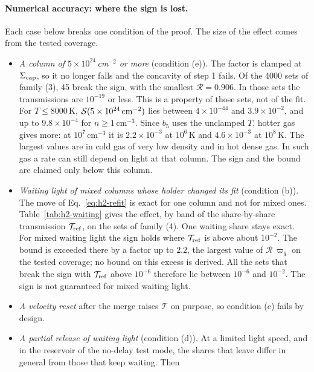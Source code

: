 \paragraph{Numerical accuracy: where the sign is lost.} Each case below breaks
one condition of the proof. The size of the effect comes from the tested
coverage.
\begin{itemize}
  \item \emph{A column of $5\times10^{24}$\,cm$^{-2}$ or more} (condition (e)).
    The factor is clamped at $\Sigma_{\rm cap}$, so it no longer falls and the
    concavity of step 1 fails. Of the 4000 sets of family (3), 45 break the
    sign, with the smallest $\mathcal R=0.906$. In those sets the transmissions
    are $10^{-19}$ or less. This is a property of those sets, not of the fit.
    For $T\le8000$\,K, $\mathcal S(5\times10^{24}\,{\rm cm^{-2}})$
    lies between $4\times10^{-44}$ and $3.9\times10^{-2}$, and up to
    $9.8\times10^{-4}$ for $n\ge1$\,cm$^{-3}$. Since $b_5$ uses the unclamped
    $T$, hotter gas gives more: at $10^7$\,cm$^{-3}$ it is $2.2\times10^{-3}$
    at $10^6$\,K and $4.6\times10^{-3}$ at $10^8$\,K. The largest values are
    in cold gas of very low density and in hot dense gas. In such gas a rate can
    still depend on light at that column. The sign and the bound are claimed
    only below this column.
  \item \emph{Waiting light of mixed columns whose holder changed its fit}
    (condition (b)). The move of Eq.~\eqref{eq:h2-refit} is exact for one
    column and not for mixed ones. Table~\ref{tab:h2-waiting} gives the effect,
    by band of the share-by-share transmission $\mathcal T_{\rm ref}$, on the
    sets of family (4). One waiting share stays exact. For mixed waiting light
    the sign holds where
    $\mathcal T_{\rm ref}$ is above about $10^{-2}$. The bound is exceeded
    there by a factor up to $2.2$, the largest value of $\mathcal R\,\varpi_q$
    on the tested coverage; no bound on this excess is derived. All the sets that break the
    sign with $\mathcal T_{\rm ref}$ above $10^{-6}$ therefore lie between
    $10^{-6}$ and $10^{-2}$. The sign is not guaranteed for mixed waiting
    light.
  \item \emph{A velocity reset} after the merge raises $\mathcal T$ on purpose,
    so condition (c) fails by design.
  \item \emph{A partial release of waiting light} (condition (d)). At a
    limited light speed, and in the reservoir of the no-delay test mode, the
    shares that leave differ in general from those that keep waiting. Then

\end{itemize}
